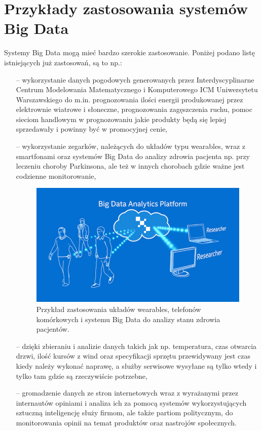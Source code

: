 \section{Przykłady zastosowania systemów Big Data}
Systemy Big Data mogą mieć bardzo szerokie zastosowanie. Poniżej podano listę istniejących już zastosowań, są to np.:

\begin{itemize}
	\item[--] wykorzystanie danych pogodowych generowanych przez Interdyscyplinarne Centrum Modelowania Matematycznego i Komputerowego ICM Uniwersytetu Warszawskiego do m.in. prognozowania ilości energii produkowanej przez elektrownie wiatrowe i słoneczne, prognozowania zagęszczenia ruchu, pomoc sieciom handlowym w prognozowaniu jakie produkty będą się lepiej sprzedawały i powinny być w promocyjnej cenie, 
	\item[--] wykorzystanie zegarków, należących do układów typu wearables, wraz z smartfonami oraz systemów Big Data do analizy zdrowia pacjenta np. przy leczeniu choroby Parkinsona, ale też w innych chorobach gdzie ważne jest codzienne monitorowanie,

\begin{figure}[h] %
	\centering
	\includegraphics[width=0.6\linewidth]{img/big_data_intel_parkinson}
	\caption{Przykład zastosowania układów wearables, telefonów komórkowych i systemu Big Data do analizy stanu zdrowia pacjentów.}
\end{figure}

	\item[--] dzięki zbieraniu i analizie danych takich jak np. temperatura, czas otwarcia drzwi, ilość kursów z wind oraz specyfikacji sprzętu przewidywany jest czas kiedy należy wykonać naprawę, a służby serwisowe wysyłane są tylko wtedy i tylko tam gdzie są rzeczywiście potrzebne,
	\item[--] gromadzenie danych ze stron internetowych wraz z wyrażanymi przez internautów opiniami i analiza ich za pomocą systemów wykorzystujących sztuczną inteligencję służy firmom, ale także partiom politycznym, do monitorowania opinii na temat produktów oraz nastrojów społecznych.
	
\end{itemize}

